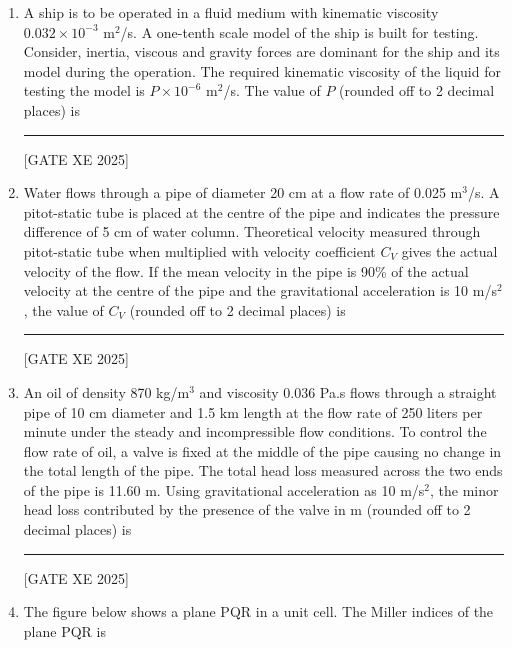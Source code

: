 \documentclass[journal,12pt,onecolumn]{IEEEtran}
\theoremstyle{remark}
\begin{document}
\begin{enumerate}
The rate of change of energy of the system which occupies the control volume at this instant is $E\times 10^6$ J/s. The value of $E$ (rounded off to 2 decimal places) is \rule{3cm}{0.15mm}

\hfill[GATE XE 2025]


\item A ship is to be operated in a fluid medium with kinematic viscosity $0.032\times 10^{-3}$ m$^2$/s. A one-tenth scale model of the ship is built for testing. Consider, inertia, viscous and gravity forces are dominant for the ship and its model during the operation. The required kinematic viscosity of the liquid for testing the model is $P\times 10^{-6}$ m$^2$/s. The value of $P$ (rounded off to 2 decimal places) is \rule{3cm}{0.15mm} \label{q:41}

\hfill[GATE XE 2025]


\item Water flows through a pipe of diameter 20 cm at a flow rate of 0.025 m$^3$/s. A pitot-static tube is placed at the centre of the pipe and indicates the pressure difference of 5 cm of water column. Theoretical velocity measured through pitot-static tube when multiplied with velocity coefficient $C_V$ gives the actual velocity of the flow. If the mean velocity in the pipe is 90\% of the actual velocity at the centre of the pipe and the gravitational acceleration is 10 m/s$^2$, the value of $C_V$ (rounded off to 2 decimal places) is \rule{3cm}{0.15mm} \label{q:42}

\hfill[GATE XE 2025]


\item An oil of density 870 kg/m$^3$ and viscosity 0.036 Pa.s flows through a straight pipe of 10 cm diameter and 1.5 km length at the flow rate of 250 liters per minute under the steady and incompressible flow conditions. To control the flow rate of oil, a valve is fixed at the middle of the pipe causing no change in the total length of the pipe. The total head loss measured across the two ends of the pipe is 11.60 m. Using gravitational acceleration as 10 m/s$^2$, the minor head loss contributed by the presence of the valve in m (rounded off to 2 decimal places) is \rule{3cm}{0.15mm} \label{q:43}

\hfill[GATE XE 2025]

\item The figure below shows a plane PQR in a unit cell. The Miller indices of the plane PQR is


\end{enumerate}
\end{document}
